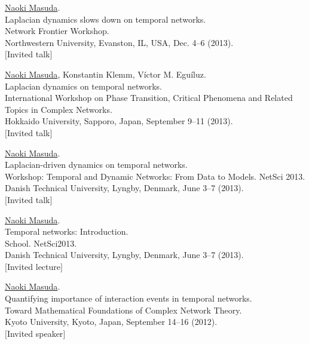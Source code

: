\documentclass[11pt,letter]{article}
\begin{document}
\begin{etaremune}
\item \underline{Naoki Masuda}.\\
Laplacian dynamics slows down on temporal networks.\\
Network Frontier Workshop.\\
Northwestern University, Evanston, IL, USA, Dec. 4--6 (2013).\\
$[$Invited talk$]$

\item \underline{Naoki Masuda}, Konstantin Klemm, V\'{i}ctor M. Egu\'{i}luz.\\
Laplacian dynamics on temporal networks.\\
International Workshop on Phase Transition, Critical Phenomena and Related Topics in Complex Networks.\\
Hokkaido University, Sapporo, Japan, September 9--11 (2013).\\
$[$Invited talk$]$

\item \underline{Naoki Masuda}.\\
Laplacian-driven dynamics on temporal networks.\\
Workshop: Temporal and Dynamic Networks: From Data to Models. NetSci 2013.\\
Danish Technical University, Lyngby, Denmark, June 3--7 (2013).\\
$[$Invited talk$]$

\item \underline{Naoki Masuda}.\\
Temporal networks: Introduction.\\
School. NetSci2013.\\
Danish Technical University, Lyngby, Denmark, June 3--7 (2013).\\
$[$Invited lecture$]$

\item \underline{Naoki Masuda}.\\
Quantifying importance of interaction events in temporal networks.\\
Toward Mathematical Foundations of Complex Network Theory.\\
Kyoto University, Kyoto, Japan, September 14--16 (2012).\\
$[$Invited speaker$]$


\end{etaremune}
\end{document}
